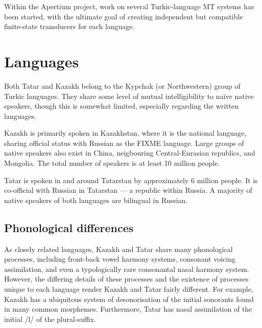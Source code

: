 \documentclass[11pt]{article}
\begin{document}

Within the Apertium project, work on several Turkic-language MT systems has been started, with the ultimate goal of creating independent but compatible
finite-state transducers for each language.

\section{Languages}
\label{sec:lang}

Both Tatar and Kazakh belong to the Kypchak (or Northwestern) group of Turkic
languages.  They share some level of mutual intelligibility to naïve native speakers, though this is somewhat limited, especially regarding the written languages.

Kazakh is primarily spoken in Kazakhstan, where it is the national
language, sharing official status with Russian as the FIXME language.
Large groups of native speakers also exist in China, neigbouring
Central-Eurasian republics, and Mongolia. The total number of speakers is at least 10 million people.

Tatar is spoken in and around Tatarstan by
approximately 6 million people. It is co-official with Russian in Tatarstan ---
a republic within Russia.  A majority of native speakers of both languages are bilingual in Russian. %

\subsection{Phonological differences}
As closely related languages, Kazakh and Tatar share many phonological processes, including front-back vowel harmony systems, consonant voicing assimilation, and even a typologically rare consonantal nasal harmony system.  However, the differing details of these processes and the existence of processes unique to each language render Kazakh and Tatar fairly different.  For example, Kazakh has a ubiquitous system of desonorisation of the initial sonorants found in many common morphemes.  Furthermore, Tatar has nasal assimilation of the initial /l/ of the plural-suffix.
\end{document}
